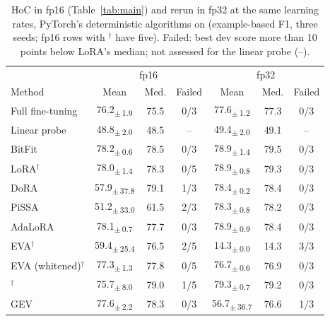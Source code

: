 \begin{table}[t]
\centering
\caption{HoC in fp16 (Table~\ref{tab:main}) and rerun in fp32 at the same learning rates, PyTorch's deterministic algorithms on (example-based F1, three seeds; fp16 rows with $^\dagger$ have five). Failed: best dev score more than 10 points below LoRA's median; not assessed for the linear probe (--).}
\label{tab:fp32}
\footnotesize
\setlength{\tabcolsep}{2.5pt}
\begin{tabular}{lcccccc}
\toprule
 & \multicolumn{3}{c}{fp16} & \multicolumn{3}{c}{fp32} \\
Method & Mean & Med. & Failed & Mean & Med. & Failed \\
\midrule
Full fine-tuning & 76.2\textsubscript{$\pm$\,1.9} & 75.5 & 0/3 & 77.6\textsubscript{$\pm$\,1.2} & 77.3 & 0/3 \\
Linear probe & 48.8\textsubscript{$\pm$\,2.0} & 48.5 & -- & 49.4\textsubscript{$\pm$\,2.0} & 49.1 & -- \\
BitFit & 78.2\textsubscript{$\pm$\,0.6} & 78.5 & 0/3 & 78.9\textsubscript{$\pm$\,1.4} & 79.5 & 0/3 \\
LoRA$^\dagger$ & 78.0\textsubscript{$\pm$\,1.4} & 78.3 & 0/5 & 78.9\textsubscript{$\pm$\,0.8} & 79.3 & 0/3 \\
DoRA & 57.9\textsubscript{$\pm$\,37.8} & 79.1 & 1/3 & 78.4\textsubscript{$\pm$\,0.2} & 78.4 & 0/3 \\
PiSSA & 51.2\textsubscript{$\pm$\,33.0} & 61.5 & 2/3 & 78.3\textsubscript{$\pm$\,0.8} & 78.2 & 0/3 \\
AdaLoRA & 78.1\textsubscript{$\pm$\,0.7} & 77.7 & 0/3 & 78.9\textsubscript{$\pm$\,0.9} & 78.4 & 0/3 \\
EVA$^\dagger$ & 59.4\textsubscript{$\pm$\,25.4} & 76.5 & 2/5 & 14.3\textsubscript{$\pm$\,0.0} & 14.3 & 3/3 \\
EVA (whitened)$^\dagger$ & 77.3\textsubscript{$\pm$\,1.3} & 77.8 & 0/5 & 76.7\textsubscript{$\pm$\,0.6} & 76.9 & 0/3 \\
\method{}$^\dagger$ & 75.7\textsubscript{$\pm$\,8.0} & 79.0 & 1/5 & 79.3\textsubscript{$\pm$\,0.7} & 79.2 & 0/3 \\
GEV & 77.6\textsubscript{$\pm$\,2.2} & 78.3 & 0/3 & 56.7\textsubscript{$\pm$\,36.7} & 76.6 & 1/3 \\
\bottomrule
\end{tabular}
\end{table}
